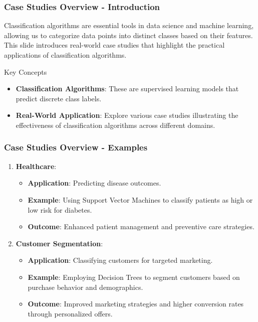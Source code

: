 \documentclass{beamer}
\begin{document}
\begin{frame}[fragile]
    \frametitle{Case Studies Overview - Introduction}
    
    Classification algorithms are essential tools in data science and machine learning, allowing us to categorize data points into distinct classes based on their features. 
    This slide introduces real-world case studies that highlight the practical applications of classification algorithms.

    \begin{block}{Key Concepts}
        \begin{itemize}
            \item \textbf{Classification Algorithms}:
            These are supervised learning models that predict discrete class labels.
            \item \textbf{Real-World Application}:
            Explore various case studies illustrating the effectiveness of classification algorithms across different domains.
        \end{itemize}
    \end{block}
\end{frame}

\begin{frame}[fragile]
    \frametitle{Case Studies Overview - Examples}
    
    \begin{enumerate}
        \item \textbf{Healthcare}:
            \begin{itemize}
                \item \textbf{Application}: Predicting disease outcomes.
                \item \textbf{Example}: Using Support Vector Machines to classify patients as high or low risk for diabetes.
                \item \textbf{Outcome}: Enhanced patient management and preventive care strategies. 
            \end{itemize}
            
        \item \textbf{Customer Segmentation}:
            \begin{itemize}
                \item \textbf{Application}: Classifying customers for targeted marketing.
                \item \textbf{Example}: Employing Decision Trees to segment customers based on purchase behavior and demographics.
                \item \textbf{Outcome}: Improved marketing strategies and higher conversion rates through personalized offers.
            \end{itemize}
    \end{enumerate}
\end{frame}
\end{document}
